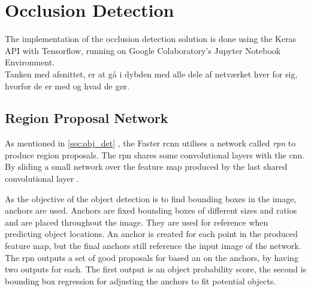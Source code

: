 %
%
%

\section{Occlusion Detection}
The implementation of the occlusion detection solution is done using the Keras API with Tensorflow, running on Google Colaboratory's Jupyter Notebook Environment.\\

Tanken med afsnittet, er at gå i dybden med alle dele af netværket hver for sig, hvorfor de er med og hvad de gør.

\subsection{Region Proposal Network}
As mentioned in \autoref{sec:obj_det} , the Faster \gls{rcnn} utilises a network called \textit{\gls{rpn}} to produce region proposals. The \gls{rpn} shares some convolutional layers with the \gls{cnn}. By sliding a small network over the feature map produced by the last shared convolutional layer \citep{Ren2017}.

As the objective of the object detection is to find bounding boxes in the image, anchors are used. Anchors are fixed bounding boxes of different sizes and ratios and are placed throughout the image. They are used for reference when predicting object locations. An anchor is created for each point in the produced feature map, but the final anchors still reference the input image of the network. The \gls{rpn} outputs a set of good proposals for based an on the anchors, by having two outputs for each. The first output is an object probability score, the second is bounding box regression for adjusting the anchors to fit potential objects.

